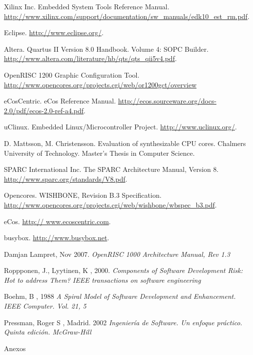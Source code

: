 \documentclass[a4paper,12pt]{report}
\begin{document}
\begin{thebibliography}{99}
Xilinx Inc. Embedded System Tools Reference Manual.  \url{http://www.xilinx.com/support/documentation/sw_manuals/edk10_est_rm.pdf}.

Eclipse. 
\url{http://www.eclipse.org/}.

Altera. Quartus II Version 8.0 Handbook. Volume 4: SOPC Builder. 
\url{http://www.altera.com/literature/hb/qts/qts_qii5v4.pdf}.

OpenRISC 1200 Graphic Configuration Tool. \url{http://www.opencores.org/projects.cgi/web/or1200gct/overview}

 eCosCentric. eCos Reference Manual. \url{http://ecos.sourceware.org/docs-2.0/pdf/ecos-2.0-ref-a4.pdf}.

 uClinux. Embedded Linux/Microcontroller Project. \url{http://www.uclinux.org/}.

 D. Mattsson, M. Christensson. Evaluation of synthesizable CPU cores. Chalmers University of Technology. Master's Thesis in Computer Science.

 SPARC International Inc. The SPARC Architecture Manual, Version 8. 
\url{http://www.sparc.org/standards/V8.pdf}.

 Opencores. WISHBONE, Revision B.3 Specification.  \url{http://www.opencores.org/projects.cgi/web/wishbone/wbspec_b3.pdf}.

 eCos. 
 \url{http:// www.ecoscentric.com}.

 busybox.
 \url{http://www.busybox.net}.



 Damjan Lampret, Nov 2007.
  \textit{OpenRISC 1000 Architecture Manual, Rev 1.3}

 Roppponen, J., Lyytinen, K , 2000. 
\textit{Components of Software Development Risk: Hot to address Them? IEEE transactions on software
engineering}

 Boehm, B , 1988  
\textit{A Spiral Model of Software Development and Enhancement. IEEE Computer. Vol. 21, 5} 

 Pressman, Roger S , Madrid. 2002
\textit{Ingeniería de Software. Un enfoque práctico. Quinta edición. McGraw-Hill} 


\end{thebibliography}

\appendix
\begin{part}{Anexos}
\newpage

\newpage
\end{part}
\end{document}
